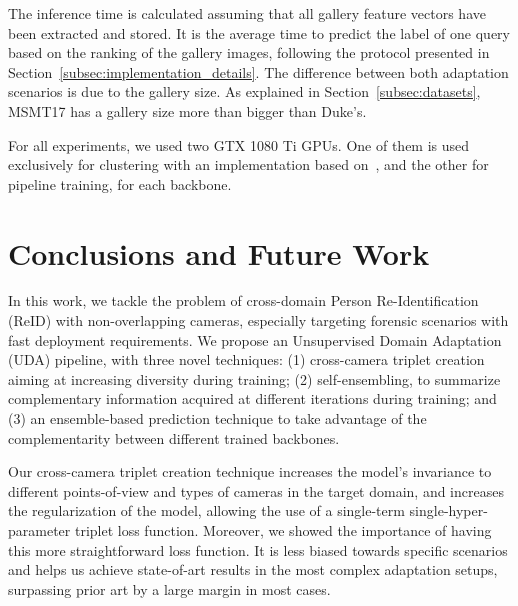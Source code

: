 \documentclass[journal]{IEEEtran}
\begin{document}
The inference time is calculated assuming that all gallery feature vectors have been extracted and stored. It is the average time to predict the label of one query based on the ranking of the gallery images, following the protocol presented in Section~\ref{subsec:implementation_details}. The difference between both adaptation scenarios is due to the gallery size. As explained in Section~\ref{subsec:datasets}, MSMT17 has a gallery size more than  bigger than Duke's. 

For all experiments, we used two GTX 1080 Ti GPUs. One of them is used exclusively for clustering with an implementation based on~\cite{melo2016hierarchical}, and the other for pipeline training, for each backbone. 


























\section{Conclusions and Future Work}
In this work, we tackle the problem of cross-domain Person Re-Identification (ReID) with non-overlapping cameras, especially targeting forensic scenarios with fast deployment requirements. We propose an Unsupervised Domain Adaptation (UDA) pipeline, with three novel techniques: (1) cross-camera triplet creation aiming at increasing diversity during training; (2) self-ensembling, to summarize complementary information acquired at different iterations during training; and (3) an ensemble-based prediction technique to take advantage of the complementarity between different trained backbones.

Our cross-camera triplet creation technique increases the model's invariance to different points-of-view and types of cameras in the target domain, and increases the regularization of the model, allowing the use of a single-term single-hyper-parameter triplet loss function. Moreover, we showed the importance of having this more straightforward loss function. It is less biased towards specific scenarios and helps us achieve state-of-art results in the most complex adaptation setups, surpassing prior art by a large margin in most cases. 
\end{document}
